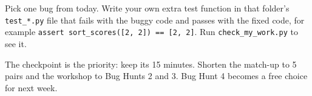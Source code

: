 \begin{stretchchallenge}
Pick one bug from today. Write your own extra test function in that folder's \texttt{test\_*.py} file that fails with the buggy code and passes with the fixed code, for example \texttt{assert sort\_scores([2, 2]) == [2, 2]}. Run \texttt{check\_my\_work.py} to see it.
\end{stretchchallenge}

\begin{teachernote}
The checkpoint is the priority: keep its 15 minutes. Shorten the match-up to 5 pairs and the workshop to Bug Hunts 2 and 3. Bug Hunt 4 becomes a free choice for next week.
\end{teachernote}
